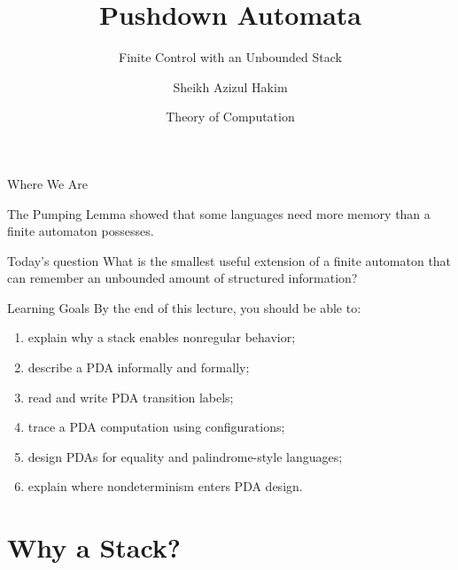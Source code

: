 \documentclass[aspectratio=169,10pt]{beamer}
\title{Pushdown Automata}
\subtitle{Finite Control with an Unbounded Stack}
\author{Sheikh Azizul Hakim}
\institute{Department of Computer Science and Engineering, BUET}
\date{Theory of Computation}
\begin{document}
\begin{frame}
    \titlepage
\end{frame}

\begin{frame}{Where We Are}
\centering
{}

\vspace{1.2em}
The Pumping Lemma showed that some languages need more memory than a finite automaton possesses.

\vspace{0.8em}
\begin{alertblock}{Today’s question}
What is the smallest useful extension of a finite automaton that can remember an unbounded amount of structured information?
\end{alertblock}
\end{frame}

\begin{frame}{Learning Goals}
By the end of this lecture, you should be able to:

\begin{enumerate}
    \item explain why a stack enables nonregular behavior;
    \item describe a PDA informally and formally;
    \item read and write PDA transition labels;
    \item trace a PDA computation using configurations;
    \item design PDAs for equality and palindrome-style languages;
    \item explain where nondeterminism enters PDA design.
\end{enumerate}
\end{frame}

\section{Why a Stack?}
\end{document}
